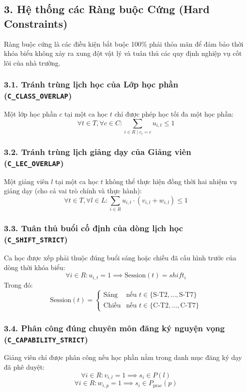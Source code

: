 \documentclass{article}
\begin{document}
\subsection*{3. Hệ thống các Ràng buộc Cứng (Hard Constraints)}

Ràng buộc cứng là các điều kiện bắt buộc 100\% phải thỏa mãn để đảm bảo thời khóa biểu không xảy ra xung đột vật lý và tuân thủ các quy định nghiệp vụ cốt lõi của nhà trường.

\subsubsection*{3.1. Tránh trùng lịch học của Lớp học phần (\texttt{C\_CLASS\_OVERLAP})}
Một lớp học phần $c$ tại một ca học $t$ chỉ được phép học tối đa một học phần:
\[
\forall t \in T, \forall c \in C: \sum_{i \in R \mid c_i = c} u_{i, t} \le 1
\]

\subsubsection*{3.2. Tránh trùng lịch giảng dạy của Giảng viên (\texttt{C\_LEC\_OVERLAP})}
Một giảng viên $l$ tại một ca học $t$ không thể thực hiện đồng thời hai nhiệm vụ giảng dạy (cho cả vai trò chính và thực hành):
\[
\forall t \in T, \forall l \in L: \sum_{i \in R} u_{i, t} \cdot (v_{i, l} + w_{i, l}) \le 1
\]

\subsubsection*{3.3. Tuân thủ buổi cố định của dòng lịch học (\texttt{C\_SHIFT\_STRICT})}
Ca học được xếp phải thuộc đúng buổi sáng hoặc chiều đã cấu hình trước của dòng thời khóa biểu:
\[
\forall i \in R: u_{i, t} = 1 \implies \text{Session}(t) = shift_i
\]
Trong đó:
\[
\text{Session}(t) = \begin{cases} \text{Sáng} & \text{nếu } t \in \{\text{S-T2}, \dots, \text{S-T7}\} \\ \text{Chiều} & \text{nếu } t \in \{\text{C-T2}, \dots, \text{C-T7}\} \end{cases}
\]

\subsubsection*{3.4. Phân công đúng chuyên môn đăng ký nguyện vọng (\texttt{C\_CAPABILITY\_STRICT})}
Giảng viên chỉ được phân công nếu học phần nằm trong danh mục đăng ký dạy đã phê duyệt:
\[
\forall i \in R: v_{i, l} = 1 \implies s_i \in P(l)
\]
\[
\forall i \in R: w_{i, p} = 1 \implies s_i \in P_{\text{prac}}(p)
\]
\end{document}
